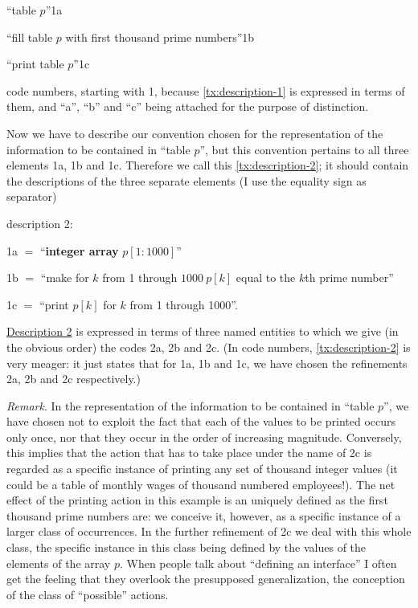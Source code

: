 \documentclass[twoside,11pt]{book}
\makeatletter
\newcommand{\labeltext}[2]{%
	\@bsphack
	\MakeLinkTarget*{#1}%
	\def\@currentlabel{#1}{\label{#2}}%
	\@esphack
}
\makeatother
\begin{document}
\noindent
``table $p$''\hfill 1a

\noindent
``fill table $p$ with first thousand prime numbers''\hfill 1b

\noindent
``print table $p$''\hfill 1c

\noindent
code numbers, starting with 1, because \ref{tx:description-1} is expressed in terms of them, and ``a'', ``b'' and ``c'' being attached for the purpose of distinction.

Now we have to describe our convention chosen for the representation of the information to be contained in ``table $p$'', but this convention pertains to all three elements 1a, 1b and 1c. Therefore we call this \ref{tx:description-2}; it should contain the descriptions of the three separate elements (I use the equality sign as separator)
\medskip

\noindent
description 2:
\labeltext{description 2}{tx:description-2}
\nopagebreak

\noindent
1a $=$ ``\textbf{integer array} $p[1 : 1000]$''

\noindent
1b $=$ ``make for $k$ from 1 through $1000\ p[k]$ equal to the $k$th prime number''

\noindent
1c $=$ ``print $p[k]$ for $k$ from 1 through 1000''.

\hyperref[tx:description-2]{Description 2} is expressed in terms of three named entities to which we give (in the obvious order) the codes 2a, 2b and 2c. (In code numbers, \ref{tx:description-2} is very meager: it just states that for 1a, 1b and 1c, we have chosen the refinements 2a, 2b and 2c respectively.)

\noindent
\textit{Remark}. In the representation of the information to be contained in ``table $p$'', we have chosen not to exploit the fact that each of the values to be printed occurs only once, nor that they occur in the order of increasing magnitude. Conversely, this implies that the action that has to take place under the name of 2c is regarded as a specific instance of printing any set of thousand integer values (it could be a table of monthly wages of thousand numbered employees!). The net effect of the printing action in this example is an uniquely defined as the first thousand prime numbers are: we conceive it, however, as a specific instance of a larger class of occurrences. In the further refinement of 2c we deal with this whole class, the specific instance in this class being defined by the values of the elements of the array $p$. When people talk about ``defining an interface'' I often get the feeling that they overlook the presupposed generalization, the conception of the class of ``possible'' actions.
\end{document}
